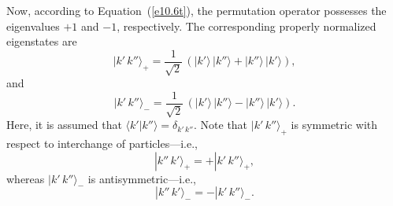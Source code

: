 Now, according to Equation~(\ref{e10.6t}), the permutation operator possesses  the eigenvalues $+1$ and $-1$, respectively. The corresponding properly normalized eigenstates are
\begin{equation}
|k'\,k''\rangle_+ = \frac{1}{\sqrt{2}}\,\left(|k'\rangle\,|k''\rangle + |k''\rangle\,|k'\rangle\right),
\end{equation}
and
\begin{equation}
|k'\,k''\rangle_- = \frac{1}{\sqrt{2}}\,\left(|k'\rangle\,|k''\rangle - |k''\rangle\,|k'\rangle\right).
\end{equation}
Here, it is assumed that $\langle k'|k''\rangle = \delta_{k'\,k''}$. Note that
$|k'\,k''\rangle_+$ is  symmetric with respect to interchange of particles---i.e., 
\begin{equation}
|k''\,k'\rangle_+ =+ |k'\,k''\rangle_+,
\end{equation}
whereas $|k'\,k''\rangle_-$ is  antisymmetric---i.e.,  
\begin{equation}
|k''\,k'\rangle_- =- |k'\,k''\rangle_-.
\end{equation}

